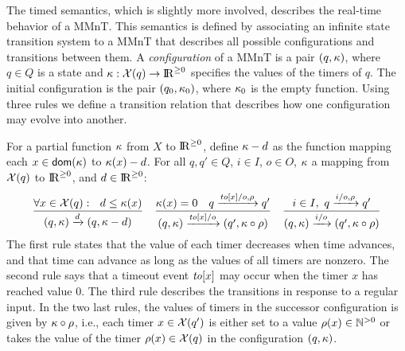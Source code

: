 The timed semantics, which is slightly more involved, describes the real-time behavior of a MMnT.
This semantics is defined by associating an infinite state transition system to a MMnT that describes all possible
configurations and transitions between them.
A \emph{configuration} of a MMnT is a pair $(q,\kappa)$, where $q \in Q$ is a state and $\kappa : \mathcal{X}(q) \rightarrow {\rm I\!R}^{\geq 0}$ 
specifies the values of the timers of $q$. The initial configuration is
the pair $(q_0, \kappa_0)$, where $\kappa_0$ is the empty function.
Using three rules we define a transition relation that describes how one configuration may evolve into another.

For a partial function $\kappa$ from $X$ to ${\rm I\!R}^{\geq 0}$, define
  $\kappa - d$ as the function mapping each $x \in {\textsf{dom}}(\kappa)$ to $\kappa(x) - d$.
For all $q, q' \in Q$, $i \in I$, $o \in O$, $\kappa$ a
mapping from $\mathcal{X}(q)$ to ${\rm I\!R}^{\geq 0}$, and $d \in {\rm I\!R}^{\geq 0}$:
\[
\frac{\forall x \in \mathcal{X}(q): \ \ d \leq \kappa(x)}{(q,\kappa) \xrightarrow{d} (q,\kappa-d)}
\quad
  \frac{\kappa(x) = 0 \quad q \xrightarrow{\mathit{to}[x]/o,\rho} q'}{(q,\kappa) \xrightarrow{\mathit{to}[x]/o} (q',\kappa\circ\rho)}
  \quad
  \frac{i \in I ,~  q \xrightarrow{i/o,\rho} q'}{(q,\kappa) \xrightarrow{i/o} (q',\kappa\circ\rho)}
\]
The first rule states that the value of each timer decreases when time advances, and that
time can advance as long as the values of all timers are nonzero.
The second rule says that a timeout event $\mathit{to}[x]$ may occur
when the timer $x$ has reached value $0$.
The third rule describes the transitions in response to a regular input.
In the two last rules, the values of timers  in the successor configuration
is given by 
$\kappa\circ\rho$, i.e., each timer $x \in \mathcal{X}(q')$ is either
set to a value $\rho(x) \in {\mathbb N}^{>0}$ or takes the value of the
timer $\rho(x) \in \mathcal{X}(q)$ in the configuration
$(q,\kappa)$.


